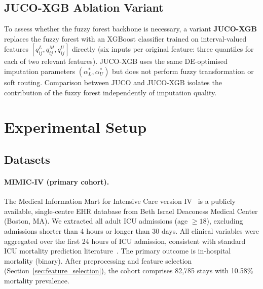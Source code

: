 \documentclass[a4paper,fleqn,longmktitle]{cas-sc}
\begin{document}
	\subsection{JUCO-XGB Ablation Variant}
	\label{sec:juco_xgb}
	
	To assess whether the fuzzy forest backbone is necessary, a variant
	\textbf{JUCO-XGB} replaces the fuzzy forest with an XGBoost classifier
	trained on interval-valued features $[q^L_{ij}, q^M_{ij}, q^U_{ij}]$
	directly (six inputs per original feature: three quantiles for each
	of two relevant features).
	JUCO-XGB uses the same DE-optimised imputation parameters
	$(\alpha_L^*, \alpha_U^*)$ but does not perform fuzzy transformation
	or soft routing.
	Comparison between JUCO and JUCO-XGB isolates the contribution of
	the fuzzy forest independently of imputation quality.
	
	
	
	
	
	
	\section{Experimental Setup}
	\label{sec:experimental_setup}
	
	\subsection{Datasets}
	\label{sec:datasets}
	
	\paragraph{MIMIC-IV (primary cohort).}
	The Medical Information Mart for Intensive Care version
	IV~\citep{johnson2023mimic} is a publicly available, single-centre
	EHR database from Beth Israel Deaconess Medical Center (Boston, MA).
	We extracted all adult ICU admissions (age $\ge 18$), excluding
	admissions shorter than 4 hours or longer than 30 days.
	All clinical variables were aggregated over the first 24 hours of
	ICU admission, consistent with standard ICU mortality prediction
	literature~\citep{purushotham2018benchmarking}.
	The primary outcome is in-hospital mortality (binary).
	After preprocessing and feature selection (Section~\ref{sec:feature_selection}),
	the cohort comprises 82{,}785 stays with
	10.58\% mortality prevalence.
	
\end{document}
